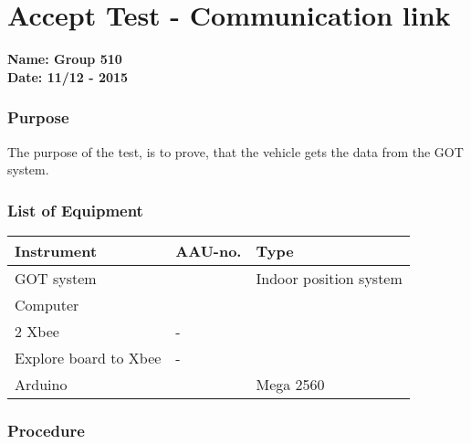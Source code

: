 \pagebreak
\section{Accept Test - Communication link} \label{app:AccTes1}
\textbf{Name: Group 510}\\
\textbf{Date: 11/12 - 2015}

\subsubsection{Purpose}
The purpose of the test, is to prove, that the vehicle gets the data from the GOT system.

\subsubsection{List of Equipment}
\begin{table}[H]
\begin{tabular}{|l|l|p{4cm}|}
\hline%
  \textbf{Instrument}                        &  \textbf{AAU-no.}  &  \textbf{Type}       \\
\hline%
  GOT system                               &   &  Indoor position system  \\
\hline%
  Computer                   		         &   &    \\
\hline%
  2 Xbee &  -             &    \\
\hline%
  Explore board to Xbee                 &  -             &                      \\
\hline
 Arduino & & Mega 2560 \\
\hline
\end{tabular}
\end{table}

\subsubsection{Procedure}

